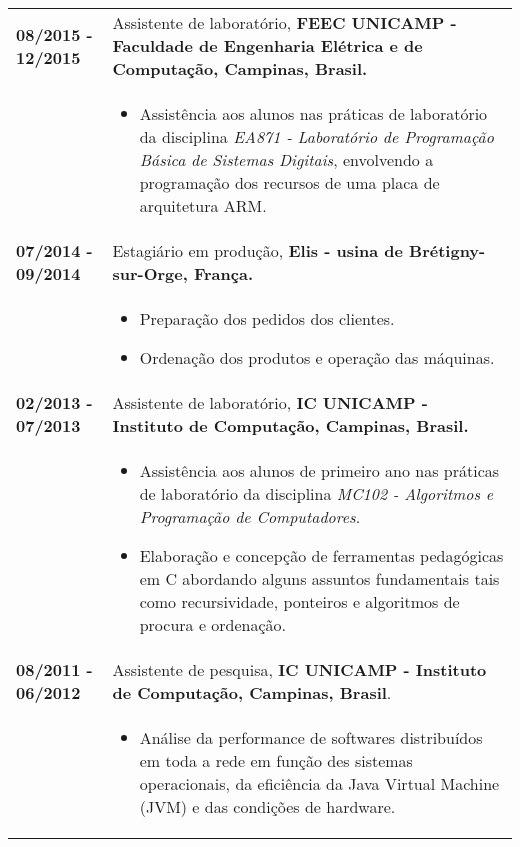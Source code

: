 \documentclass[10pt, a4paper]{article}
\begin{document}
\begin{tabular}{p{} p{}}

\textbf{08/2015 - 12/2015}  & Assistente de laboratório, \textbf{FEEC
 UNICAMP - Faculdade de Engenharia Elétrica e de Computação, Campinas, Brasil.}
 \\
  & \vspace{-12pt}
  \begin{itemize}
    \item Assistência aos alunos nas práticas de laboratório da
    disciplina \textit{EA871 - Laboratório de Programação Básica de Sistemas
    Digitais}, envolvendo a programação dos recursos de uma placa de arquitetura
    ARM.
    
	\end{itemize}\\

 \textbf{07/2014 - 09/2014}   & Estagiário em  produção,
 \textbf{Elis -  usina de Brétigny-sur-Orge, França.}\\
  & \vspace{-12pt}
  \begin{itemize}
    \item Preparação dos pedidos dos clientes. \vspace{-8pt}
    \item Ordenação dos produtos e operação das máquinas.
  \end{itemize} \\

 \textbf{02/2013 - 07/2013}   & Assistente de laboratório, \textbf{IC
 UNICAMP - Instituto de Computação, Campinas, Brasil.} \\
  & \vspace{-12pt}
  \begin{itemize}
    \item Assistência aos alunos de primeiro ano nas práticas de laboratório da
    disciplina \textit{MC102 - Algoritmos e Programação de Computadores}.
    \vspace{-8pt}
    \item Elaboração e concepção de ferramentas pedagógicas em C
    abordando alguns assuntos fundamentais tais como recursividade, ponteiros e
    algoritmos de procura e ordenação.
	\end{itemize}\\

 \textbf{08/2011 - 06/2012} & Assistente de pesquisa, \textbf{IC UNICAMP -
 Instituto de Computação, Campinas, Brasil}. \\
 & \vspace{-12pt}
 \begin{itemize}
 	\item Análise da performance de softwares distribuídos em toda a rede em
 	função des sistemas operacionais, da eficiência da Java Virtual Machine (JVM)
 	e das condições de hardware.
 	\end{itemize}
 \\
 

\end{tabular}
\end{document}

